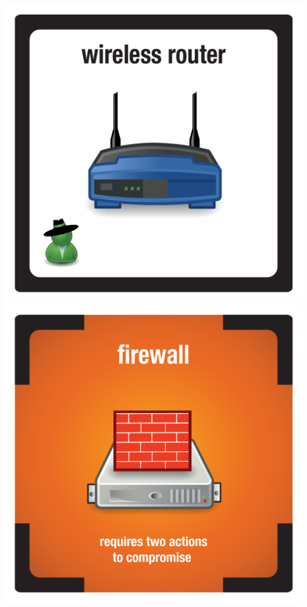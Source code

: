 \documentclass{letter}
\begin{document}
\includegraphics{tiles/node_wireless_router}
\includegraphics{tiles/node_firewall_compromised} \\
\end{document}
